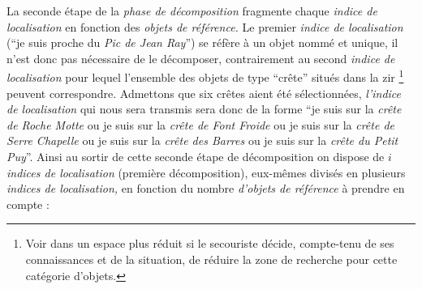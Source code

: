 \begin{quote}
\end{quote}

La seconde étape de la \emph{phase de décomposition} fragmente chaque
\emph{indice de localisation} en fonction des \emph{objets de
  référence.} Le premier \emph{indice de localisation} (\enquote{je
  suis proche du \emph{Pic de Jean Ray}}) se réfère à un objet nommé
et unique, il n'est donc pas nécessaire de le décomposer,
contrairement au second \emph{indice de localisation} pour lequel
l'ensemble des objets de type \enquote{crête} situés dans la \ac{zir}
\footnote{Voir dans un espace plus réduit si le secouriste décide,
  compte-tenu de ses connaissances et de la situation, de réduire la
  zone de recherche pour cette catégorie d'objets.} peuvent
correspondre. Admettons que six crêtes aient été sélectionnées,
\emph{l'indice de localisation} qui nous sera transmis sera donc de la
forme \enquote{je suis sur la \emph{crête de Roche Motte} ou je suis
  sur la \emph{crête de Font Froide} ou je suis sur la \emph{crête de
    Serre Chapelle} ou je suis sur la \emph{crête des Barres} ou je
  suis sur la \emph{crête du Petit Puy}}. Ainsi au sortir de cette
seconde étape de décomposition on dispose de \(i\) \emph{indices de
  localisation} (première décomposition), eux-mêmes divisés en
plusieurs \emph{indices de localisation,} en fonction du nombre
\emph{d'objets de référence} à prendre en compte :

\begin{quote}
\end{quote}


